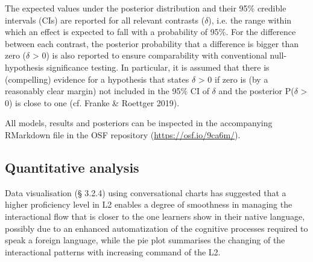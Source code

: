 \begin{styleStandard}
The expected values under the posterior distribution and their 95\% credible intervals (CIs) are reported for all relevant contrasts ($\delta $), i.e. the range within which an effect is expected to fall with a probability of 95\%. For the difference between each contrast, the posterior probability that a difference is bigger than zero ($\delta $ {\textgreater} 0) is also reported to ensure comparability with conventional null-hypothesis significance testing. In particular, it is assumed that there is (compelling) evidence for a hypothesis that states $\delta $ {\textgreater} 0 if zero is (by a reasonably clear margin) not included in the 95\% CI of $\delta $ and the posterior P($\delta $ {\textgreater} 0) is close to one (cf. Franke \& Roettger 2019).
\end{styleStandard}

\begin{styleStandard}
All models, results and posteriors can be inspected in the accompanying RMarkdown file in the OSF repository (\url{https://osf.io/9ca6m/}).
\end{styleStandard}

\subsection{Quantitative analysis}
\hypertarget{Toc191305935}{}\begin{styleStandard}
Data visualisation (§ 3.2.4) using conversational charts has suggested that a higher proficiency level in L2 enables a degree of smoothness in managing the interactional flow that is closer to the one learners show in their native language, possibly due to an enhanced automatization of the cognitive processes required to speak a foreign language, while the pie plot summarises the changing of the interactional patterns with increasing command of the L2. 
\end{styleStandard}


